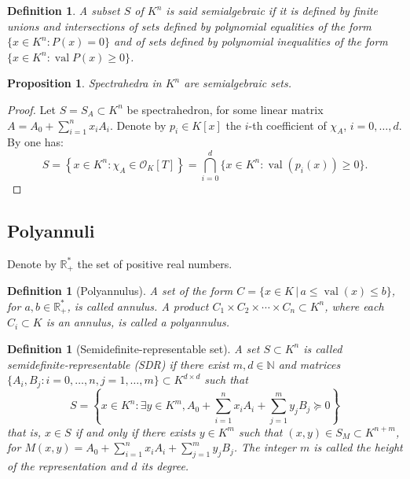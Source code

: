 \documentclass[a4paper,12pt]{article}
\newtheorem{proposition}[theorem]{Proposition}
\newtheorem{definition}[theorem]{Definition}
\newcommand{\R}{\mathbb{R}} %
\newcommand{\N}{\mathbb{N}} %
\newcommand{\corentin}[1]{{\color{red} #1}} %
\DeclareMathOperator{\val}{val}
\newcommand{\OK}{\mathcal{O}_K}
\begin{document}
\begin{definition}
  A subset $S$ of $K^n$ is said \emph{semialgebraic} if it is defined by finite unions and intersections of sets defined by polynomial equalities of the form $\{ x \in K^n  : P( x) = 0 \}$ and of sets defined by polynomial inequalities of the form $\{ x\in K^n : \val P(x) \geq 0 \}$.
\end{definition}

\begin{proposition}
  Spectrahedra in $K^n$ are semialgebraic sets. 
\end{proposition}

\begin{proof}
  Let $S = S_A \subset K^n$ be spectrahedron, for some linear matrix $A = A_0+\sum_{i=1}^n x_i A_i$. 
  Denote by $p_i \in K[x]$ the $i$-th coefficient of $\chi_{A}$, $i=0,\ldots,d$.
  By  one has:
  $$
  S = \left\{x \in K^n : \chi_{A} \in \OK[T]\right\}
  = \bigcap_{i=0}^d \{x \in K^n : \val(p_i(x)) \geq 0\}.
  $$
\end{proof}


\subsection{Polyannuli}

Denote by $\R^*_+$ the set of positive real numbers.

\begin{definition}[Polyannulus]\label{def_annuli}
  A set of the form $C = \{x \in K \,|\, a \le \val(x) \le b\}$, for $a,b \in \R^*_+$,
  is called \emph{annulus}. A product $C_1 \times C_2 \times \cdots \times C_n \subset K^n$,
  where each $C_i \subset K$ is an annulus, is called a \emph{polyannulus}.
\end{definition}

\begin{definition}[Semidefinite-representable set]\label{def_semi_def_rep_set}
  A set $S \subset K^n$ is called \emph{semide\-fi\-nite-re\-pre\-sen\-ta\-ble (SDR)} if there exist $m,d \in \N$ and
  matrices $\{A_i,B_j : i = 0, \ldots, n, j = 1, \ldots, m\} \subset K^{d \times d}$ such that
  $$
  S = \left\{x \in K^n : \exists y \in K^m, A_0+\sum_{i=1}^n x_iA_i + \sum_{j=1}^m y_jB_j \succeq 0\right\}
  $$
  that is, $x \in S$ if and only if there exists $y \in K^m$ such that
  $(x,y) \in S_M \subset K^{n+m}$, for $M(x,y) = A_0+\sum_{i=1}^n x_iA_i + \sum_{j=1}^m y_jB_j$.
  The integer $m$ is called the \emph{height} of the representation and $d$ its \emph{degree}.
\end{definition}
\end{document}
